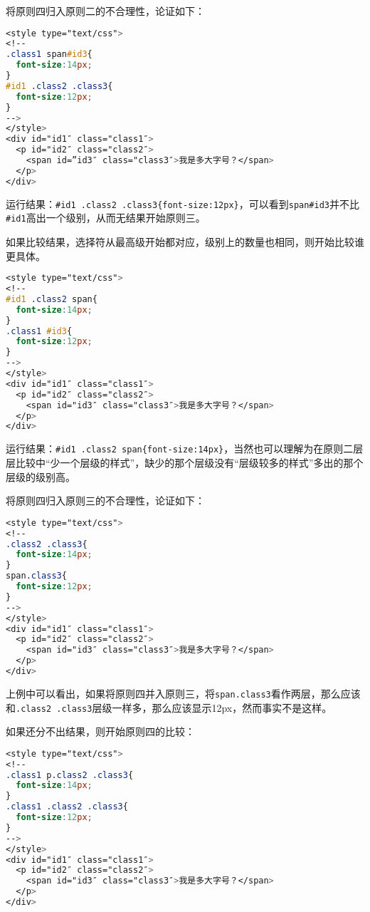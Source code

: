 将原则四归入原则二的不合理性，论证如下：



\begin{lstlisting}[language=CSS]
<style type="text/css">
<!--
.class1 span#id3{
  font-size:14px;
}
#id1 .class2 .class3{
  font-size:12px;
}
-->
</style>
<div id="id1″ class="class1″>
  <p id="id2″ class="class2″>
    <span id=”id3″ class="class3″>我是多大字号？</span>
  </p>
</div>


\end{lstlisting}

运行结果：\verb|#id1 .class2 .class3{font-size:12px}|，可以看到\texttt{span\#id3}并不比\texttt{\#id1}高出一个级别，从而无结果开始原则三。

如果比较结果，选择符从最高级开始都对应，级别上的数量也相同，则开始比较谁更具体。


\begin{lstlisting}[language=CSS]
<style type="text/css">
<!--
#id1 .class2 span{
  font-size:14px;
}
.class1 #id3{
  font-size:12px;
}
-->
</style>
<div id="id1″ class="class1″>
  <p id="id2″ class="class2″>
    <span id="id3″ class="class3″>我是多大字号？</span>
  </p>
</div>
\end{lstlisting}


运行结果：\verb|#id1 .class2 span{font-size:14px}|，当然也可以理解为在原则二层层比较中“少一个层级的样式”，缺少的那个层级没有“层级较多的样式”多出的那个层级的级别高。

将原则四归入原则三的不合理性，论证如下：


\begin{lstlisting}[language=CSS]
<style type="text/css">
<!--
.class2 .class3{
  font-size:14px;
}
span.class3{
  font-size:12px;
}
-->
</style>
<div id="id1″ class="class1″>
  <p id="id2″ class="class2″>
    <span id="id3″ class="class3″>我是多大字号？</span>
  </p>
</div>
\end{lstlisting}

上例中可以看出，如果将原则四并入原则三，将\texttt{span.class3}看作两层，那么应该和\texttt{.class2 .class3}层级一样多，那么应该显示12px，然而事实不是这样。

如果还分不出结果，则开始原则四的比较：



\begin{lstlisting}[language=CSS]
<style type="text/css">
<!--
.class1 p.class2 .class3{
  font-size:14px;
}
.class1 .class2 .class3{
  font-size:12px;
}
-->
</style>
<div id="id1″ class="class1″>
  <p id="id2″ class="class2″>
    <span id="id3″ class="class3″>我是多大字号？</span>
  </p>
</div>
\end{lstlisting}


